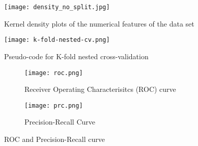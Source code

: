 \begin{figure}[ht]
    \centering
    \texttt{[image: density\_no\_split.jpg]}
    \caption{Kernel density plots of the numerical features of the data set}
    \label{fig:density}
\end{figure}
\begin{figure}[ht]
 \centering
 \texttt{[image: k-fold-nested-cv.png]}
 \caption{Pseudo-code for K-fold nested cross-validation \cite{RN194}}
 \label{fig:cv}
\end{figure}
\begin{figure}
 \centering
 \begin{subfigure}{0.6\textwidth}
  \centering
  \texttt{[image: roc.png]}
  \caption{Receiver Operating Characterisitcs (ROC) curve}
  \label{fig:roc}
 \end{subfigure}
 \begin{subfigure}{0.6\textwidth}
  \centering
  \texttt{[image: prc.png]}
  \caption{Precision-Recall Curve}
  \label{fig:prc}
 \end{subfigure}
 \caption{ROC and Precision-Recall curve}
 \label{fig:prc-roc}
\end{figure}


